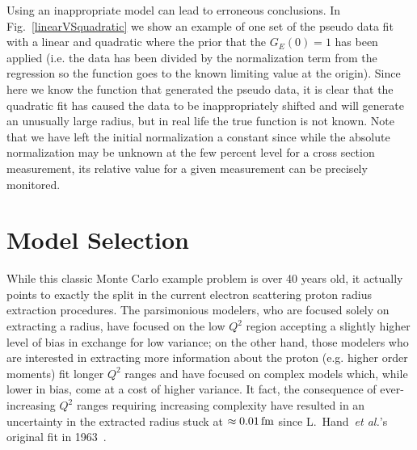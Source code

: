 \documentclass[10pt,aps,prc,twocolumn]{revtex4-1}
\begin{document}
Using an inappropriate model can lead to erroneous conclusions.
In Fig.~\ref{linearVSquadratic} we show an
example of one set of the pseudo data fit with a linear and quadratic where the prior that the
$G_E(0)=1$ has been applied (i.e. the data has been divided by the normalization term from the regression
so the function goes to the known limiting value at the origin).
Since here we know the function that generated the pseudo data, it is clear that the quadratic
fit has caused the data to be inappropriately shifted and will generate an unusually large radius, 
but in real life the true function is not known.
Note that we have left the initial normalization a constant since while the absolute normalization may be
unknown at the few percent level for a cross section measurement, its relative value for a given measurement
can be precisely monitored. 

\section{Model Selection}

While this classic Monte Carlo example problem is over 40 years old, it actually points to exactly the split in 
the current electron scattering proton radius extraction procedures.     The parsimonious modelers, who are 
focused solely on extracting a radius, have focused on the low $Q^2$ region accepting a slightly higher 
level of bias in exchange for low variance; on the other hand, those modelers who are interested in extracting more information 
about the proton (e.g. higher order moments) fit longer $Q^2$ ranges and have
focused on complex models which, while lower in bias, come at a cost of higher variance.  
It fact, the consequence of ever-increasing $Q^2$ ranges requiring increasing complexity have resulted in
an uncertainty in the extracted radius 
stuck at $\approx \unit[0.01]{fm}$ since L.~Hand~\textit{et al.}'s original fit in 1963~\cite{Hand:1963zz}.
\end{document}
